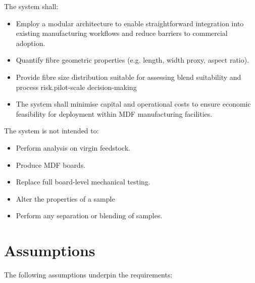 \documentclass[a4paper, 12pt, english]{article}
\begin{document}
The system shall:

\begin{itemize}
    \item Employ a modular architecture to enable straightforward integration into existing manufacturing workflows and reduce barriers to commercial adoption.
    \item Quantify fibre geometric properties (e.g. length, width proxy, aspect ratio).
    \item Provide fibre size distribution suitable for assessing blend suitability and process risk.pilot-scale decision-making
    \item The system shall minimise capital and operational costs to ensure economic feasibility for deployment within MDF manufacturing facilities.
\end{itemize}

The system is not intended to:

\begin{itemize}
    \item Perform analysis on virgin feedstock.
    \item Produce MDF boards.
    \item Replace full board-level mechanical testing.
    \item Alter the properties of a sample
    \item Perform any separation or blending of samples.
\end{itemize}


\section{Assumptions}

The following assumptions underpin the requirements:
\end{document}
